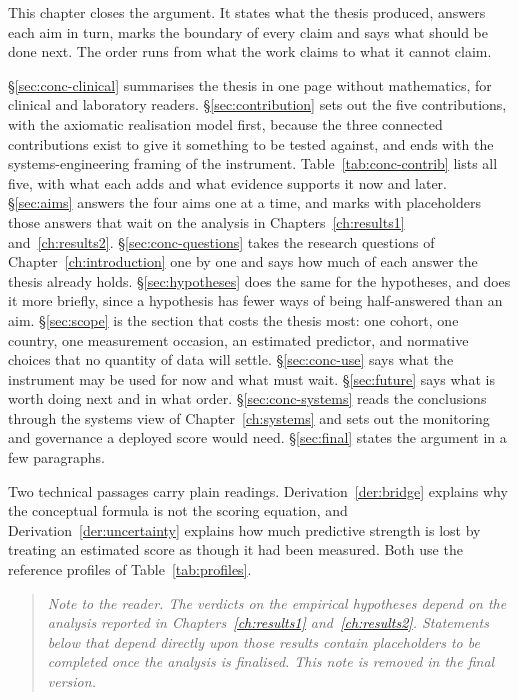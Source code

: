 
\label{ch:conclusions}


\begin{ataglance}
This chapter closes the argument. It states what the thesis produced, answers
each aim in turn, marks the boundary of every claim and says what should be
done next. The order runs from what the work claims to what it cannot claim.

\S\ref{sec:conc-clinical} summarises the thesis in one page without
mathematics, for clinical and laboratory readers.
\S\ref{sec:contribution} sets out the five contributions, with the axiomatic
realisation model first, because the three connected contributions exist to give
it something to be tested against, and ends with the systems-engineering framing
of the instrument. Table~\ref{tab:conc-contrib} lists all five, with what each
adds and what evidence supports it now and later. \S\ref{sec:aims} answers the four aims one at a time, and
marks with placeholders those answers that wait on the analysis in
Chapters~\ref{ch:results1} and~\ref{ch:results2}. \S\ref{sec:conc-questions}
takes the research questions of Chapter~\ref{ch:introduction} one by one and
says how much of each answer the thesis already holds. \S\ref{sec:hypotheses}
does the same for the hypotheses, and does it more briefly, since a hypothesis
has fewer ways of being half-answered than an aim. \S\ref{sec:scope} is the
section that costs the thesis most: one cohort, one country, one measurement
occasion, an estimated predictor, and normative choices that no quantity of
data will settle. \S\ref{sec:conc-use} says what the instrument may be used
for now and what must wait. \S\ref{sec:future} says what is worth doing next and
in what order. \S\ref{sec:conc-systems} reads the conclusions through the
systems view of Chapter~\ref{ch:systems} and sets out the monitoring and
governance a deployed score would need. \S\ref{sec:final} states the argument in
a few paragraphs.

Two technical passages carry plain readings.
Derivation~\ref{der:bridge} explains why the conceptual formula is not the
scoring equation, and Derivation~\ref{der:uncertainty} explains how much
predictive strength is lost by treating an estimated score as though it had
been measured. Both use the reference profiles of Table~\ref{tab:profiles}.
\end{ataglance}

\begin{quote}
\small\itshape
Note to the reader. The verdicts on the empirical hypotheses depend on the analysis reported in Chapters~\ref{ch:results1} and~\ref{ch:results2}. Statements below that depend directly upon those results contain placeholders to be completed once the analysis is finalised. This note is removed in the final version.
\end{quote}

